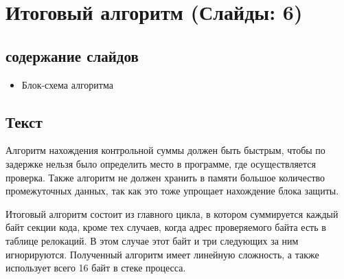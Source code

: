
\section{Итоговый алгоритм (Слайды: 6)}

\subsection{содержание слайдов}
\begin{itemize}
  \item Блок-схема алгоритма
\end{itemize}

\subsection{Текст}

Алгоритм нахождения контрольной суммы должен быть быстрым, чтобы по задержке
нельзя было определить место в программе, где осуществляется проверка. Также
алгоритм не должен хранить в памяти большое количество промежуточных данных, так
как это тоже упрощает нахождение блока защиты.

Итоговый алгоритм состоит из главного цикла, в котором суммируется каждый байт
секции кода, кроме тех случаев, когда адрес проверяемого байта есть в таблице
релокаций. В этом случае этот байт и три следующих за ним игнорируются. 
Полученный алгоритм имеет линейную сложность, а также использует всего 16 байт
в стеке процесса.
